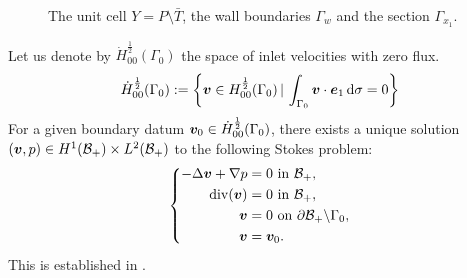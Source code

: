 \documentclass[a4paper,10pt,reqno]{amsart}
\begin{document}
\begin{figure}
    \centering  
    \caption{The unit cell $Y=P\setminus \bar T$, the wall boundaries $\Gamma_w$ and the
    section $\Gamma_{x_1}$.}
    \label{fig:1e8x0}
\end{figure}
Let us denote by $\dot{H}^{\frac{1}{2}}_{00}(\Gamma_0)$ the space   of inlet
velocities with zero flux.
\newcommand{\dotH}{\dot{H}^{\frac{1}{2}}_{00}(\Gamma_0)}
\[
\dotH:=\left\{ \v\in H^{\frac{1}{2}}_{00}(\Gamma_0)\, | \,
\int_{\Gamma_0}\v\cdot\e_1\D \sigma =0\right\}
\] 
For a given boundary datum $\v_0\in \dotH $, there exists a unique solution $({\bm v},p)\in
H^{1}(\mathcal{B}_+)\times L^{2}(\mathcal{B}_+)$ to the
following Stokes problem:  
\[
\left\{\begin{aligned}
        -\Delta {\bm v}+\nabla p& = 0\textrm{ in } \mathcal{B}_+,\\    
        \mathrm{div}({\bm v}) &= 0 \textrm{ in } \mathcal{B}_+,\\  
        {\bm v}& = 0 \textrm{ on } \partial \mathcal{B}_+\backslash \Gamma_0,\\    
        {\bm v} &= {\bm v}_0.
\end{aligned}
\right.
\] 
This is established in \cite{nazarov_navier-stokes_2000-1,feppon_asymptotic_2024}.  
    
\end{document}
